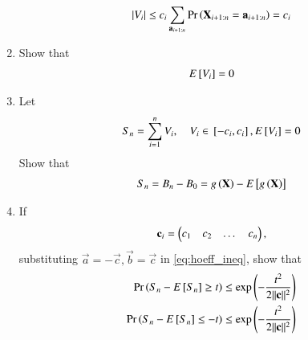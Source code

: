 \documentclass[journal,12pt,twocolumn]{IEEEtran}
\renewcommand\thesection{\arabic{section}}
\begin{document}
\begin{enumerate}[label=\thesection.\arabic*,ref=\thesection.\theenumi]
\begin{align}
\left\vert V_i\right\vert \le c_i \sum_{\mathbf{a}_{i+1:n}}\Pr\left(\mathbf{X}_{i+1:n} = \mathbf{a}_{i+1:n}\right) = c_i
\end{align}
\item Show that 
\begin{align}
 E{}\left[V_i\right]  = 0
\end{align}
\item Let
\begin{align}
S_n=\sum_{i=1}^{n} V_i, \quad V_i \in {}\left[-c_i,c_i\right], E{}\left[V_i\right]  = 0
\end{align}
%
Show that
\begin{align}
S_n = B_n - B_0 = g\left(\mathbf{X}\right)-E{}\left[g\left(\mathbf{X}\right)\right]
\end{align}
\item If 
\begin{align}
\mathbf{c}_i = \begin{pmatrix}c_1 & c_2 & \dots & c_n\end{pmatrix},
\end{align}
substituting $\vec{a} = -\vec{c}, \vec{b} = \vec{c}$ in \eqref{eq:hoeff_ineq}, show that
\begin{align}
\label{eq:mcdiarmid}
\Pr\left(S_n- E{}\left[S_n\right] \ge t\right) &\le \exp\left(-\frac{t^2}{2\lVert\mathbf{c}\rVert^2}\right)
\\
\Pr\left(S_n- E{}\left[S_n\right] \le -t\right) &\le \exp\left(-\frac{t^2}{2\lVert\mathbf{c}\rVert^2}\right)
\end{align}
%

\end{enumerate}
\end{document}

